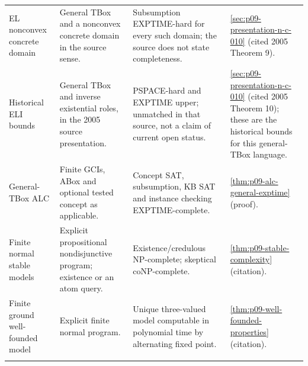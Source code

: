 \begin{landscape}
\begin{longtable}{@{}p{.18\linewidth}p{.25\linewidth}p{.23\linewidth}p{.26\linewidth}@{}}
EL nonconvex concrete domain & General TBox and a nonconvex concrete domain in the source sense. & Subsumption EXPTIME-hard for every such domain; the source does not state completeness. & \cref{sec:p09-presentation-n-c-010} (cited 2005 Theorem 9).\\\addlinespace
Historical ELI bounds & General TBox and inverse existential roles, in the 2005 source presentation. & PSPACE-hard and EXPTIME upper; unmatched in that source, not a claim of current open status. & \cref{sec:p09-presentation-n-c-010} (cited 2005 Theorem 10); these are the historical bounds for this general-TBox language.\\\addlinespace
General-TBox ALC & Finite GCIs, ABox and optional tested concept as applicable. & Concept SAT, subsumption, KB SAT and instance checking EXPTIME-complete. & \cref{thm:p09-alc-general-exptime} (proof).\\\addlinespace
Finite normal stable models & Explicit propositional nondisjunctive program; existence or an atom query. & Existence/credulous NP-complete; skeptical coNP-complete. & \cref{thm:p09-stable-complexity} (citation).\\\addlinespace
Finite ground well-founded model & Explicit finite normal program. & Unique three-valued model computable in polynomial time by alternating fixed point. & \cref{thm:p09-well-founded-properties} (citation).\\\addlinespace
\end{longtable}
\endgroup
\end{landscape}

